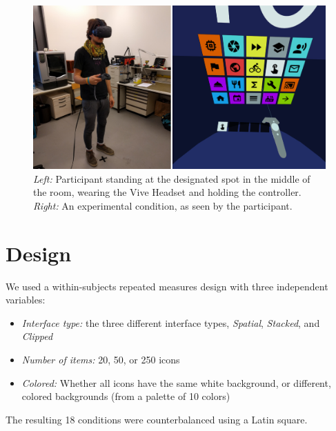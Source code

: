 \documentclass[nobib]{tufte-book} %
\begin{document}
\begin{figure}
  \includegraphics{participant+view.png}
  \caption{\emph{Left:} Participant standing at the designated spot in the middle of the room, wearing the Vive Headset and holding the controller. \emph{Right:} An experimental condition, as seen by the participant.}
  \label{fig:participant-view}
\end{figure}

\section{Design}
We used a within-subjects repeated measures design with three independent variables:

\begin{itemize}
  \item \emph{Interface type:} the three different interface types, \emph{Spatial}, \emph{Stacked}, and \emph{Clipped}
  \item \emph{Number of items:} 20, 50, or 250 icons
  \item \emph{Colored:} Whether all icons have the same white background, or different, colored backgrounds (from a palette of 10 colors)
\end{itemize}

The resulting 18 conditions were counterbalanced using a Latin square.
\end{document}
